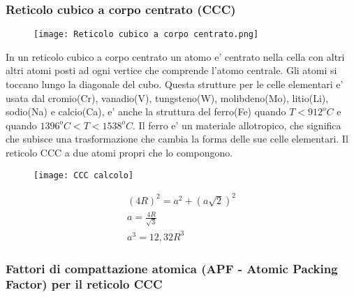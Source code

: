 \documentclass{article}
\begin{document}
            \subsubsection{Reticolo cubico a corpo centrato (CCC)}
                \begin{figure}[h!]
                    \centering
                    \texttt{[image: Reticolo cubico a corpo centrato.png]}
                \end{figure}
                In un reticolo cubico a corpo centrato un atomo e' centrato nella cella con altri altri atomi posti ad ogni vertice che comprende l'atomo centrale.
                Gli atomi si toccano lungo la diagonale del cubo.
                \newline \newline Questa strutture per le celle elementari e' usata dal cromio(Cr), vanadio(V), tungsteno(W), molibdeno(Mo), litio(Li), sodio(Na) e calcio(Ca), e' anche
                la struttura del ferro(Fe) quando $T<912^o C$ e quando $1396^o C<T<1538^o C$.
                \newline \newline Il ferro e' un materiale allotropico, che significa che subisce una trasformazione che cambia la forma delle sue celle elementari.
                \newline \newline Il reticolo CCC a due atomi propri che lo compongono.
                \begin{figure}[h!]
                    \centering
                    \texttt{[image: CCC calcolo]}
                \end{figure}
                \begin{gather}
                    (4R)^2 = a^2 + (a \sqrt{2})^2 \\
                    a = \frac{4R}{\sqrt{3}} \label{CCC_reference} \\
                    a^3 = 12,32 R^3
                \end{gather}

            \subsubsection{Fattori di compattazione atomica (APF - Atomic Packing Factor) per il reticolo CCC}
\end{document}
